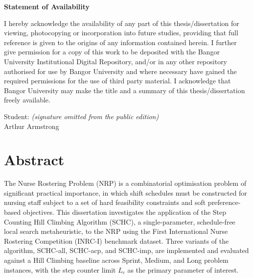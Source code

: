 \documentclass[12pt, a4paper, oneside]{report}
\begin{document}
\begin{mdframed}
\textbf{Statement of Availability}

\medskip
I hereby acknowledge the availability of any part of this
thesis/dissertation for viewing, photocopying or incorporation into
future studies, providing that full reference is given to the origins
of any information contained herein. I further give permission for a
copy of this work to be deposited with the Bangor University
Institutional Digital Repository, and/or in any other repository
authorised for use by Bangor University and where necessary have
gained the required permissions for the use of third party material.
I acknowledge that Bangor University may make the title and a summary
of this thesis/dissertation freely available.

Student:
\vspace{0.5cm}
\hspace{2cm}
{\small\itshape (signature omitted from the public edition)}\\[0.1cm]
\vspace{0.4cm}
Arthur Armstrong
\end{mdframed}

\newpage

\chapter*{Abstract}

The Nurse Rostering Problem (NRP) is a combinatorial optimisation
problem of significant practical importance, in which shift schedules
must be constructed for nursing staff subject to a set of hard
feasibility constraints and soft preference-based objectives. This
dissertation investigates the application of the Step Counting Hill
Climbing Algorithm (SCHC), a single-parameter, schedule-free local
search metaheuristic, to the NRP using the First International Nurse
Rostering Competition (INRC-I) benchmark dataset. Three variants of
the algorithm, SCHC-all, SCHC-acp, and SCHC-imp, are implemented and
evaluated against a Hill Climbing baseline across Sprint,
Medium, and Long problem instances, with the step
counter limit $L_c$ as the primary parameter of interest.
\end{document}
